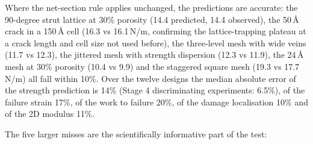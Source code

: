 Where the net-section rule applies unchanged, the predictions are accurate: the 90-degree strut lattice at 30\% porosity (14.4 predicted, 14.4 observed), the 50\,\AA{} crack in a 150\,\AA{} cell (16.3 vs 16.1\,N/m, confirming the lattice-trapping plateau at a crack length and cell size not used before), the three-level mesh with wide veins (11.7 vs 12.3), the jittered mesh with strength dispersion (12.3 vs 11.9), the 24\,\AA{} mesh at 30\% porosity (10.4 vs 9.9) and the staggered square mesh (19.3 vs 17.7\,N/m) all fall within 10\%. Over the twelve designs the median absolute error of the strength prediction is 14\% (Stage 4 discriminating experiments: 6.5\%), of the failure strain 17\%, of the work to failure 20\%, of the damage localisation 10\% and of the 2D modulus 11\%.

The five larger misses are the scientifically informative part of the test:
